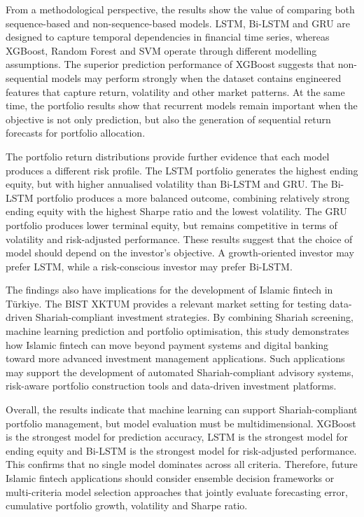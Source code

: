 From a methodological perspective, the results show the value of comparing both sequence-based and non-sequence-based models. LSTM, Bi-LSTM and GRU are designed to capture temporal dependencies in financial time series, whereas XGBoost, Random Forest and SVM operate through different modelling assumptions. The superior prediction performance of XGBoost suggests that non-sequential models may perform strongly when the dataset contains engineered features that capture return, volatility and other market patterns. At the same time, the portfolio results show that recurrent models remain important when the objective is not only prediction, but also the generation of sequential return forecasts for portfolio allocation.

The portfolio return distributions provide further evidence that each model produces a different risk profile. The LSTM portfolio generates the highest ending equity, but with higher annualised volatility than Bi-LSTM and GRU. The Bi-LSTM portfolio produces a more balanced outcome, combining relatively strong ending equity with the highest Sharpe ratio and the lowest volatility. The GRU portfolio produces lower terminal equity, but remains competitive in terms of volatility and risk-adjusted performance. These results suggest that the choice of model should depend on the investor's objective. A growth-oriented investor may prefer LSTM, while a risk-conscious investor may prefer Bi-LSTM.

The findings also have implications for the development of Islamic fintech in Türkiye. The BIST XKTUM provides a relevant market setting for testing data-driven Shariah-compliant investment strategies. By combining Shariah screening, machine learning prediction and portfolio optimisation, this study demonstrates how Islamic fintech can move beyond payment systems and digital banking toward more advanced investment management applications. Such applications may support the development of automated Shariah-compliant advisory systems, risk-aware portfolio construction tools and data-driven investment platforms.

Overall, the results indicate that machine learning can support Shariah-compliant portfolio management, but model evaluation must be multidimensional. XGBoost is the strongest model for prediction accuracy, LSTM is the strongest model for ending equity and Bi-LSTM is the strongest model for risk-adjusted performance. This confirms that no single model dominates across all criteria. Therefore, future Islamic fintech applications should consider ensemble decision frameworks or multi-criteria model selection approaches that jointly evaluate forecasting error, cumulative portfolio growth, volatility and Sharpe ratio.